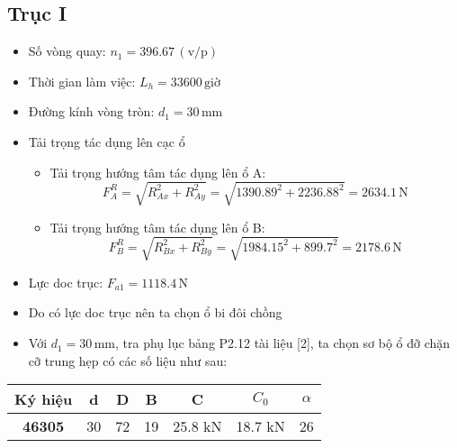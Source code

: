 \subsection{Trục I}
\begin{itemize}
    \item Số vòng quay: $n_1 = 396.67 \, (\text{v}/\text{p})$
    \item Thời gian làm việc: $L_h = 33600 \, \text{giờ}$
    \item Đường kính vòng tròn: $d_1 = 30 \, \text{mm}$
    \item Tải trọng tác dụng lên cạc ổ
    \begin{itemize}
        \item Tải trọng hướng tâm tác dụng lên ổ A:
        \[
        F_A^R = \sqrt{R_{Ax}^2 + R_{Ay}^2} = \sqrt{1390.89^2 + 2236.88^2} = 2634.1 \, \text{N}
        \]
        \item Tải trọng hướng tâm tác dụng lên ổ B:
        \[
        F_B^R = \sqrt{R_{Bx}^2 + R_{By}^2} = \sqrt{1984.15^2 + 899.7^2} = 2178.6 \, \text{N}
        \]
    \end{itemize}
    \item Lực doc trục: $F_{a1} = 1118.4 \, \text{N}$
    \item Do có lực doc trục nên ta chọn ổ bi đôi chồng
    \item Với $d_1 = 30 \, \text{mm}$, tra phụ lục bảng P2.12 tài liệu [2], ta chọn sơ bộ ổ đỡ chặn cỡ trung hẹp có các số liệu như sau:
\end{itemize}
\begin{center}
\begin{tabular}{|c|c|c|c|c|c|c|}
    \hline
    \textbf{Ký hiệu} & \textbf{d} & \textbf{D} & \textbf{B} & \textbf{C} & \textbf{$C_0$} & \textbf{$\alpha$} \\
    \hline
    \textbf{46305} & 30 & 72 & 19 & 25.8 kN & 18.7 kN & 26 \\
    \hline
\end{tabular}
\end{center}
